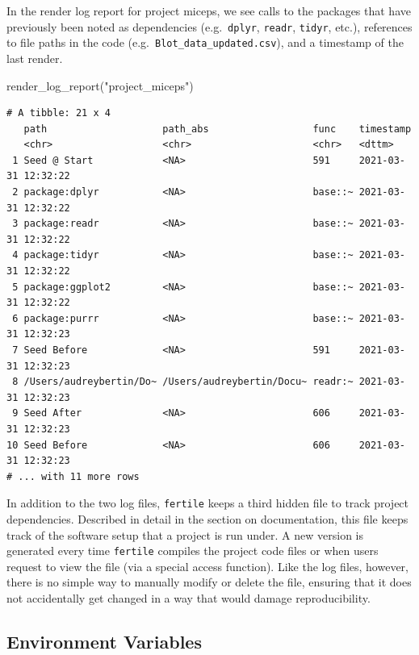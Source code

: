 \documentclass[12pt,twoside]{reedthesis}
\newenvironment{Shaded}{\begin{snugshade}}{\end{snugshade}}
\newcommand{\FunctionTok}[1]{\textcolor[rgb]{0.00,0.00,0.00}{#1}}
\newcommand{\NormalTok}[1]{#1}
\newcommand{\StringTok}[1]{\textcolor[rgb]{0.31,0.60,0.02}{#1}}
\begin{document}
In the render log report for project miceps, we see calls to the packages that have previously been noted as dependencies (e.g.~\texttt{dplyr}, \texttt{readr}, \texttt{tidyr}, etc.), references to file paths in the code (e.g.~\texttt{Blot\_data\_updated.csv}), and a timestamp of the last render.
\begin{Shaded}
\begin{Highlighting}[]
\FunctionTok{render\_log\_report}\NormalTok{(}\StringTok{"project\_miceps"}\NormalTok{)}
\end{Highlighting}
\end{Shaded}
\footnotesize
\begin{verbatim}
# A tibble: 21 x 4
   path                    path_abs                  func    timestamp          
   <chr>                   <chr>                     <chr>   <dttm>             
 1 Seed @ Start            <NA>                      591     2021-03-31 12:32:22
 2 package:dplyr           <NA>                      base::~ 2021-03-31 12:32:22
 3 package:readr           <NA>                      base::~ 2021-03-31 12:32:22
 4 package:tidyr           <NA>                      base::~ 2021-03-31 12:32:22
 5 package:ggplot2         <NA>                      base::~ 2021-03-31 12:32:22
 6 package:purrr           <NA>                      base::~ 2021-03-31 12:32:23
 7 Seed Before             <NA>                      591     2021-03-31 12:32:23
 8 /Users/audreybertin/Do~ /Users/audreybertin/Docu~ readr:~ 2021-03-31 12:32:23
 9 Seed After              <NA>                      606     2021-03-31 12:32:23
10 Seed Before             <NA>                      606     2021-03-31 12:32:23
# ... with 11 more rows
\end{verbatim}
\normalsize

In addition to the two log files, \texttt{fertile} keeps a third hidden file to track project dependencies. Described in detail in the section on documentation, this file keeps track of the software setup that a project is run under. A new version is generated every time \texttt{fertile} compiles the project code files or when users request to view the file (via a special access function). Like the log files, however, there is no simple way to manually modify or delete the file, ensuring that it does not accidentally get changed in a way that would damage reproducibility.

\hypertarget{environment-variables}{%
\subsection{Environment Variables}\label{environment-variables}}
\end{document}

